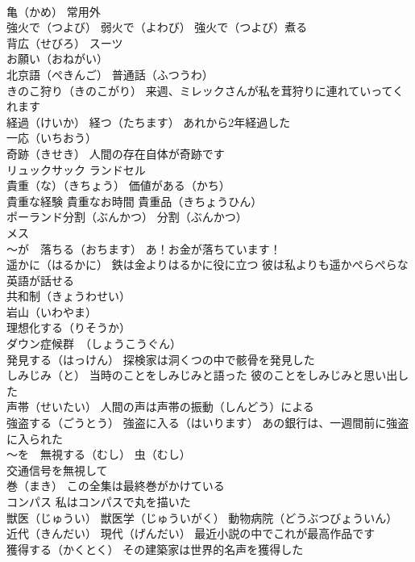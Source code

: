 \documentclass[8pt]{extreport}
\begin{document}
\begin{CJK}{UTF8}{min}
\\	亀（かめ） 常用外
\\	強火で（つよび） 弱火で（よわび） 強火で（つよび）煮る
\\	背広（せびろ） スーツ
\\	お願い（おねがい）
\\	北京語（ぺきんご） 普通話（ふつうわ）
\\	きのこ狩り（きのこがり） 来週、ミレックさんが私を茸狩りに連れていってくれます
\\	経過（けいか） 経つ（たちます） あれから2年経過した
\\	一応（いちおう） 
\\	奇跡（きせき） 人間の存在自体が奇跡です
\\	リュックサック ランドセル
\\	貴重（な）（きちょう） 価値がある（かち）
\\	貴重な経験 貴重なお時間 貴重品（きちょうひん）
\\	ポーランド分割（ぶんかつ） 分割（ぶんかつ）
\\	メス
\\	～が　落ちる（おちます） あ！お金が落ちています！
\\	遥かに（はるかに） 鉄は金よりはるかに役に立つ 彼は私よりも遥かぺらぺらな英語が話せる
\\	共和制（きょうわせい）
\\	岩山（いわやま）
\\	理想化する（りそうか）
\\	ダウン症候群　（しょうこうぐん）
\\	発見する（はっけん） 探検家は洞くつの中で骸骨を発見した
\\	しみじみ（と） 当時のことをしみじみと語った 彼のことをしみじみと思い出した
\\	声帯（せいたい） 人間の声は声帯の振動（しんどう）による
\\	強盗する（ごうとう） 強盗に入る（はいります） あの銀行は、一週間前に強盗に入られた
\\	～を　無視する（むし） 虫（むし）
\\	交通信号を無視して
\\	巻（まき） この全集は最終巻がかけている
\\	コンパス 私はコンパスで丸を描いた
\\	獣医（じゅうい） 獣医学（じゅういがく） 動物病院（どうぶつびょういん）
\\	近代（きんだい） 現代（げんだい） 最近小説の中でこれが最高作品です
\\	獲得する（かくとく） その建築家は世界的名声を獲得した

\end{CJK}
\end{document}
